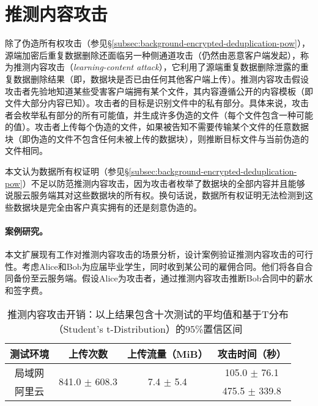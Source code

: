 \section{推测内容攻击}
\label{sec:featurespy-attack}

除了伪造所有权攻击（参见\S\ref{subsec:background-encrypted-deduplication-pow}），源端加密后重复数据删除还面临另一种侧通道攻击（仍然由恶意客户端发起），称为推测内容攻击（{\em learning-content attack}）\cite{harnik2010side, zuo2018mitigating}，它利用了源端重复数据删除泄露的重复数据删除结果（即，数据块是否已由任何其他客户端上传）。推测内容攻击假设攻击者先验地知道某些受害客户端拥有某个文件，其内容遵循公开的内容模板（即文件大部分内容已知）。攻击者的目标是识别文件中的私有部分。具体来说，攻击者会枚举私有部分的所有可能值，并生成许多伪造的文件（每个文件包含一种可能的值）。攻击者上传每个伪造的文件，如果被告知不需要传输某个文件的任意数据块（即伪造的文件不包含任何未被上传的数据块），则推断目标文件与当前伪造的文件相同。

本文认为数据所有权证明\cite{halevi11}（参见\S\ref{subsec:background-encrypted-deduplication-pow}）不足以防范推测内容攻击，因为攻击者枚举了数据块的全部内容并且能够说服云服务端其对这些数据块的所有权。换句话说，数据所有权证明无法检测到这些数据块是完全由客户真实拥有的还是刻意伪造的。

\paragraph*{案例研究。}
本文扩展现有工作\cite{harnik2010side,zuo2018mitigating}对推测内容攻击的场景分析，设计案例验证推测内容攻击的可行性。考虑Alice和Bob为应届毕业学生，同时收到某公司的雇佣合同。他们将各自合同备份至云服务端。假设Alice为攻击者，通过推测内容攻击推断Bob合同中的薪水和签字费。

\begin{table}[!htb]
    \small
    \centering
    \begin{tabular}{@{}cccc@{}}
    \toprule
    测试环境 & 上传次数                            & 上传流量（MiB）                       & 攻击时间（秒）        \\ \midrule
    局域网  & \multirow{2}{*}{841.0 $\pm$ 608.3} & \multirow{2}{*}{7.4 $\pm$ 5.4} & 105.0 $\pm$ 76.1 \\
    阿里云  &                                 &                                 & 475.5 $\pm$ 339.8 \\
    \bottomrule
    \end{tabular}
    \caption{推测内容攻击开销：以上结果包含十次测试的平均值和基于T分布（Student's t-Distribution）的95\%置信区间}
    \label{tab:LRI-verify}
\end{table}

